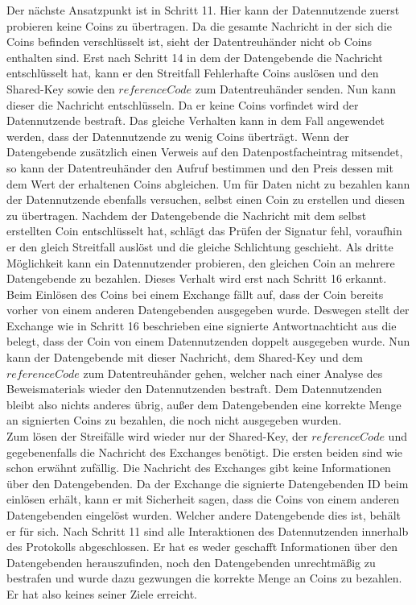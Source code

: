\documentclass[
	fontsize=12pt,
	headings=small,
	parskip=half,           %
	bibliography=totoc,
	numbers=noenddot,       %
	open=any,               %
]{scrreprt}
\begin{document}
Der nächste Ansatzpunkt ist in Schritt 11. Hier kann der Datennutzende zuerst probieren keine Coins zu übertragen. Da die gesamte Nachricht in der sich die Coins befinden verschlüsselt ist, sieht der Datentreuhänder nicht ob Coins enthalten sind. Erst nach Schritt 14 in dem der Datengebende die Nachricht entschlüsselt hat, kann er den Streitfall Fehlerhafte Coins auslösen und den Shared-Key sowie den $referenceCode$ zum Datentreuhänder senden. Nun kann dieser die Nachricht entschlüsseln. Da er keine Coins vorfindet wird der Datennutzende bestraft. Das gleiche Verhalten kann in dem Fall angewendet werden, dass der Datennutzende zu wenig Coins überträgt. Wenn der Datengebende zusätzlich einen Verweis auf den Datenpostfacheintrag mitsendet, so kann der Datentreuhänder den Aufruf bestimmen und den Preis dessen mit dem Wert der erhaltenen Coins abgleichen. Um für Daten nicht zu bezahlen kann der Datennutzende ebenfalls versuchen, selbst einen Coin zu erstellen und diesen zu übertragen. Nachdem der Datengebende die Nachricht mit dem selbst erstellten Coin entschlüsselt hat, schlägt das Prüfen der Signatur fehl, voraufhin er den gleich Streitfall auslöst und die gleiche Schlichtung geschieht. Als dritte Möglichkeit kann ein Datennutzender probieren, den gleichen Coin an mehrere Datengebende zu bezahlen. Dieses Verhalt wird erst nach Schritt 16 erkannt. Beim Einlösen des Coins bei einem Exchange fällt auf, dass der Coin bereits vorher von einem anderen Datengebenden ausgegeben wurde. Deswegen stellt der Exchange wie in Schritt 16 beschrieben eine signierte Antwortnachticht aus die belegt, dass der Coin von einem Datennutzenden doppelt ausgegeben wurde. Nun kann der Datengebende mit dieser Nachricht, dem Shared-Key und dem $referenceCode$ zum Datentreuhänder gehen, welcher nach einer Analyse des Beweismaterials wieder den Datennutzenden bestraft. Dem Datennutzenden bleibt also nichts anderes übrig, außer dem Datengebenden eine korrekte Menge an signierten Coins zu bezahlen, die noch nicht ausgegeben wurden.\\

Zum lösen der Streifälle wird wieder nur der Shared-Key, der $referenceCode$ und gegebenenfalls die Nachricht des Exchanges benötigt. Die ersten beiden sind wie schon erwähnt zufällig. Die Nachricht des Exchanges gibt keine Informationen über den Datengebenden. Da der Exchange die signierte Datengebenden ID beim einlösen erhält, kann er mit Sicherheit sagen, dass die Coins von einem anderen Datengebenden eingelöst wurden. Welcher andere Datengebende dies ist, behält er für sich. Nach Schritt 11 sind alle Interaktionen des Datennutzenden innerhalb des Protokolls abgeschlossen. Er hat es weder geschafft Informationen über den Datengebenden herauszufinden, noch den Datengebenden unrechtmäßig zu bestrafen und wurde dazu gezwungen die korrekte Menge an Coins zu bezahlen. Er hat also keines seiner Ziele erreicht.
\end{document}

